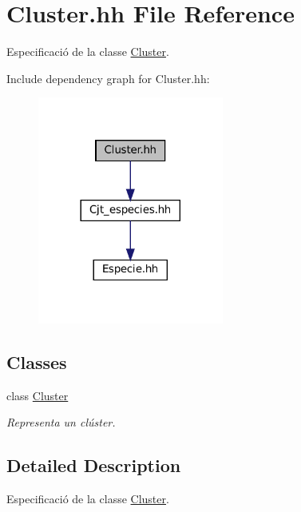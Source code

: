 \hypertarget{_cluster_8hh}{}\section{Cluster.\+hh File Reference}
\label{_cluster_8hh}


Especificació de la classe \hyperlink{class_cluster}{Cluster}.  


Include dependency graph for Cluster.\+hh\+:\nopagebreak
\begin{figure}[H]
\begin{center}
\leavevmode
\includegraphics[width=173pt]{_cluster_8hh__incl}
\end{center}
\end{figure}
\subsection*{Classes}
\begin{DoxyCompactItemize}
\item 
class \hyperlink{class_cluster}{Cluster}
\begin{DoxyCompactList}\small\item\em Representa un clúster. \end{DoxyCompactList}\end{DoxyCompactItemize}


\subsection{Detailed Description}
Especificació de la classe \hyperlink{class_cluster}{Cluster}. 

